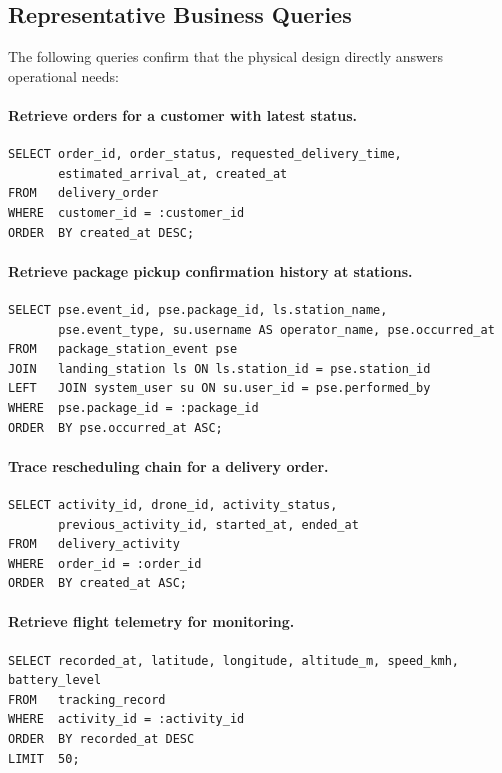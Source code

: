 \subsection{Representative Business Queries}

The following queries confirm that the physical design directly answers operational needs:

\paragraph{Retrieve orders for a customer with latest status.}
\begin{verbatim}
SELECT order_id, order_status, requested_delivery_time,
       estimated_arrival_at, created_at
FROM   delivery_order
WHERE  customer_id = :customer_id
ORDER  BY created_at DESC;
\end{verbatim}

\paragraph{Retrieve package pickup confirmation history at stations.}
\begin{verbatim}
SELECT pse.event_id, pse.package_id, ls.station_name,
       pse.event_type, su.username AS operator_name, pse.occurred_at
FROM   package_station_event pse
JOIN   landing_station ls ON ls.station_id = pse.station_id
LEFT   JOIN system_user su ON su.user_id = pse.performed_by
WHERE  pse.package_id = :package_id
ORDER  BY pse.occurred_at ASC;
\end{verbatim}

\paragraph{Trace rescheduling chain for a delivery order.}
\begin{verbatim}
SELECT activity_id, drone_id, activity_status,
       previous_activity_id, started_at, ended_at
FROM   delivery_activity
WHERE  order_id = :order_id
ORDER  BY created_at ASC;
\end{verbatim}

\paragraph{Retrieve flight telemetry for monitoring.}
\begin{verbatim}
SELECT recorded_at, latitude, longitude, altitude_m, speed_kmh, battery_level
FROM   tracking_record
WHERE  activity_id = :activity_id
ORDER  BY recorded_at DESC
LIMIT  50;
\end{verbatim}

